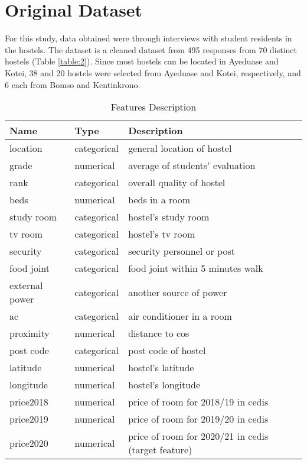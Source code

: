 
\begin{sloppypar}
	
	\section{Original Dataset}
	For this study, data obtained were through interviews with student residents in the hostels.
	The dataset is a cleaned dataset from 495 responses from 70 distinct hostels (Table \ref{table:2}).
	Since most hostels can be located in Ayeduase and Kotei, 38 and 20 hostels were selected from Ayeduase and Kotei, respectively, and 6 each from Bomso and Kentinkrono.

		\begin{longtable}{p{3cm}p{3cm}p{7cm}}
			\caption{Features Description} 
			\label{table:1} \\
			\hline
			\textbf{Name} & \textbf{Type} & \textbf{Description} \\ \hline
			location & categorical & general location of hostel \\ %
			grade & numerical & average of students' evaluation \\ %
			rank & categorical & overall quality of hostel \\ %
			beds & numerical & beds in a room \\ %
			study room & categorical & hostel's study room \\ %
			tv room & categorical & hostel's tv room \\ %
			security & categorical & security personnel or post \\ %
			food joint & categorical & food joint within 5 minutes walk \\ %
			external power & categorical & another source of power \\ %
			ac & categorical & air conditioner in a room \\ %
			proximity & numerical & distance to \ac{cos} \\ %
			post code & categorical & post code of hostel \\ %
			latitude & numerical & hostel's latitude \\ %
			longitude & numerical & hostel's longitude \\ %
			price2018 & numerical & price of room for 2018/19 in cedis \\ %
			price2019 & numerical & price of room for 2019/20 in cedis \\ %
			price2020 & numerical & price of room for 2020/21 in cedis (target feature) \\ \hline
		\end{longtable}
	

\end{sloppypar}

